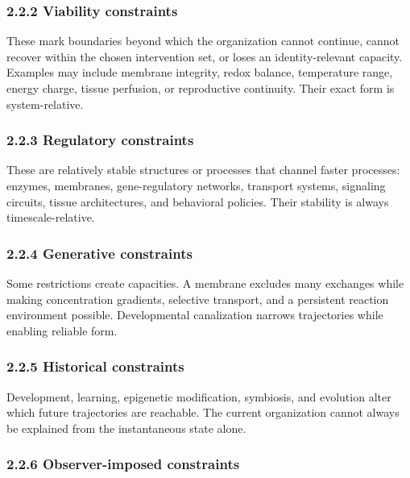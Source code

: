 \documentclass[
  11pt,
]{article}
\begin{document}
\subsubsection{2.2.2 Viability constraints}\label{viability-constraints}

These mark boundaries beyond which the organization cannot continue,
cannot recover within the chosen intervention set, or loses an
identity-relevant capacity. Examples may include membrane integrity,
redox balance, temperature range, energy charge, tissue perfusion, or
reproductive continuity. Their exact form is system-relative.

\subsubsection{2.2.3 Regulatory
constraints}\label{regulatory-constraints}

These are relatively stable structures or processes that channel faster
processes: enzymes, membranes, gene-regulatory networks, transport
systems, signaling circuits, tissue architectures, and behavioral
policies. Their stability is always timescale-relative.

\subsubsection{2.2.4 Generative
constraints}\label{generative-constraints}

Some restrictions create capacities. A membrane excludes many exchanges
while making concentration gradients, selective transport, and a
persistent reaction environment possible. Developmental canalization
narrows trajectories while enabling reliable form.

\subsubsection{2.2.5 Historical
constraints}\label{historical-constraints}

Development, learning, epigenetic modification, symbiosis, and evolution
alter which future trajectories are reachable. The current organization
cannot always be explained from the instantaneous state alone.

\subsubsection{2.2.6 Observer-imposed
constraints}\label{observer-imposed-constraints}
\end{document}

